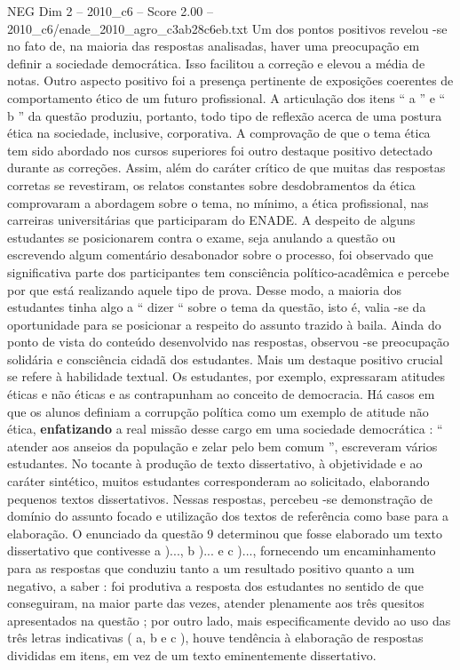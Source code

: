 \begin{textsample}{NEG Dim 2 – 2010\_c6 – Score 2.00 – 2010\_c6/enade\_2010\_agro\_c3ab28c6eb.txt}
Um dos pontos positivos revelou -se no fato de, na maioria das respostas analisadas, haver uma preocupação em definir a sociedade democrática.
Isso facilitou a correção e elevou a média de notas.
Outro aspecto positivo foi a presença pertinente de exposições coerentes de comportamento ético de um futuro profissional.
A articulação dos itens “ a ” e “ b ” da questão produziu, portanto, todo tipo de reflexão acerca de uma postura ética na sociedade, inclusive, corporativa.
A comprovação de que o tema ética tem sido abordado nos cursos superiores foi outro destaque positivo detectado durante as correções.
Assim, além do caráter crítico de que muitas das respostas corretas se revestiram, os relatos constantes sobre desdobramentos da ética comprovaram a abordagem sobre o tema, no mínimo, a ética profissional, nas carreiras universitárias que participaram do ENADE.
A despeito de alguns estudantes se posicionarem contra o exame, seja anulando a questão ou escrevendo algum comentário desabonador sobre o processo, foi observado que significativa parte dos participantes tem consciência político-acadêmica e percebe por que está realizando aquele tipo de prova.
Desse modo, a maioria dos estudantes tinha algo a “ dizer “ sobre o tema da questão, isto é, valia -se da oportunidade para se posicionar a respeito do assunto trazido à baila.
Ainda do ponto de vista do conteúdo desenvolvido nas respostas, observou -se preocupação solidária e consciência cidadã dos estudantes.
Mais um destaque positivo crucial se refere à habilidade textual.
Os estudantes, por exemplo, expressaram atitudes éticas e não éticas e as contrapunham ao conceito de democracia.
Há casos em que os alunos definiam a corrupção política como um exemplo de atitude não ética, \textbf{enfatizando} a real missão desse cargo em uma sociedade democrática : “ atender aos anseios da população e zelar pelo bem comum ”, escreveram vários estudantes.
No tocante à produção de texto dissertativo, à objetividade e ao caráter sintético, muitos estudantes corresponderam ao solicitado, elaborando pequenos textos dissertativos.
Nessas respostas, percebeu -se demonstração de domínio do assunto focado e utilização dos textos de referência como base para a elaboração.
O enunciado da questão 9 determinou que fosse elaborado um texto dissertativo que contivesse a )..., b )... e c )..., fornecendo um encaminhamento para as respostas que conduziu tanto a um resultado positivo quanto a um negativo, a saber : foi produtiva a resposta dos estudantes no sentido de que conseguiram, na maior parte das vezes, atender plenamente aos três quesitos apresentados na questão ; por outro lado, mais especificamente devido ao uso das três letras indicativas ( a, b e c ), houve tendência à elaboração de respostas divididas em itens, em vez de um texto eminentemente dissertativo.

\end{textsample}
